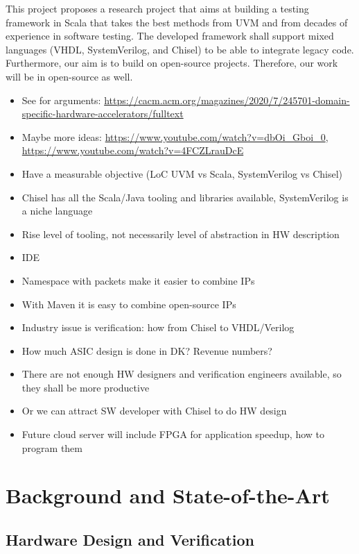 \documentclass[fleqn,12pt]{article}
\begin{document}
This project proposes a research project that aims at building a testing framework
in Scala that takes the best methods from UVM and from decades of experience
in software testing.
The developed framework shall support mixed languages (VHDL, SystemVerilog, and Chisel)
to be able to integrate legacy code.
Furthermore, our aim is to build on open-source projects. Therefore, our
work will be in open-source as well.

\begin{itemize}
\item See for arguments: \url{https://cacm.acm.org/magazines/2020/7/245701-domain-specific-hardware-accelerators/fulltext}
\item Maybe more ideas: \url{https://www.youtube.com/watch?v=dbOi_Gboi_0}, \url{https://www.youtube.com/watch?v=4FCZLrauDcE}
\item Have a measurable objective (LoC UVM vs Scala, SystemVerilog vs Chisel)
\item Chisel has all the Scala/Java tooling and libraries available, SystemVerilog is a niche language
\item Rise level of tooling, not necessarily level of abstraction in HW description
\item IDE
\item Namespace with packets make it easier to combine IPs
\item With Maven it is easy to combine open-source IPs
\item Industry issue is verification: how from Chisel to VHDL/Verilog
\item How much ASIC design is done in DK? Revenue numbers?
\item There are not enough HW designers and verification engineers available, so they shall be more productive
\item Or we can attract SW developer with Chisel to do HW design
\item Future cloud server will include FPGA for application speedup, how to program them
\end{itemize}

\section{Background and State-of-the-Art}
\label{sec:background}


\subsection{Hardware Design and Verification}
\end{document}
